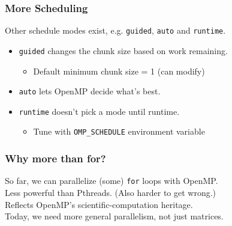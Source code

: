 \begin{frame}[fragile]
  \frametitle{More Scheduling}

  
  
  Other schedule modes exist, e.g. {\tt guided}, {\tt auto} and {\tt runtime}.
      
  \begin{itemize}
    \item {\tt guided} changes the chunk size based on work
          remaining.
          
      \begin{itemize}
        \item Default minimum chunk size = 1 (can modify)
      \end{itemize}
    \item {\tt auto} lets OpenMP decide what's best.
    \item {\tt runtime} doesn't pick a mode until runtime.
      \begin{itemize}
        \item Tune with \verb+OMP_SCHEDULE+ environment variable
      \end{itemize}
  \end{itemize}
  

\end{frame}


\begin{frame}[fragile]
  \frametitle{Why more than for?}

\large
  
  So far, we can parallelize (some) {\tt for} loops with OpenMP.\\[1em]

  Less powerful than Pthreads. (Also harder to get wrong.)\\[1em]

  Reflects OpenMP's scientific-computation heritage.\\[1em]

  Today, we need more general parallelism, not just matrices.
  


\end{frame}

